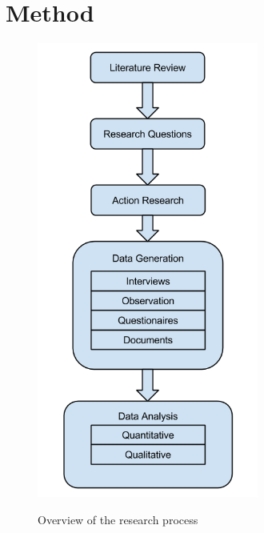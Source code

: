 \chapter{Method}

\begin{figure}
\centering
\includegraphics[height=15cm, natwidth=421, natheight=869]{empirical/method/images/overviewOfResearchProcess.png}
\label{oorp}
\caption{Overview of the research process}
\end{figure}





